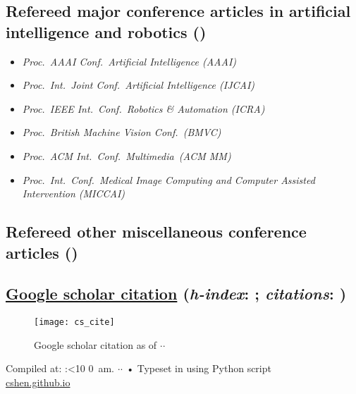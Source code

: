 \documentclass[9pt, a4paper]{article}
\newif\iftimePM
\def\now{\number\timehh:\ifnum\timemm<10 0\fi\number\timemm
         \iftimePM {$\,$pm.}  \else {$\,$am.}  \fi}
\edef\today{\number\day$\cdot$\number\month$\cdot$\number\year}
\begin{document}
\subsection*{Refereed major conference articles in artificial intelligence and robotics (\unskip)
}
{
\begin{itemize}
  \itemsep -.12cm
\footnotesize
\item \emph{  Proc.\ AAAI Conf.\ Artificial Intelligence (AAAI)}
\item \emph{  Proc.\ Int.\ Joint Conf.\ Artificial Intelligence (IJCAI)}
\item \emph{  Proc.\ IEEE Int.\ Conf.\  Robotics \&  Automation (ICRA)}
\item \emph{  Proc.\ British Machine Vision Conf.\ (BMVC)}
\item \emph{  Proc.\ ACM Int.\  Conf.\  Multimedia\ (ACM MM)}
\item \emph{  Proc.\ Int.\ Conf.\ Medical Image Computing and Computer Assisted Intervention (MICCAI)}

\end{itemize}
}




\noindent






\vspace{-0.15cm}
\subsection*{Refereed other miscellaneous  conference articles (\unskip)}
\noindent









\subsection*{\href{https://scholar.google.com/citations?hl=en&user=Ljk2BvIAAAAJ&view_op=list_works}{Google scholar citation} ({\it h-index}:  \unskip; {\it citations}: \unskip) }

\begin{figure}[h!]
\centering
\texttt{[image: cs\_cite]}
\caption{Google scholar citation as of \today}
\label{fig:google_scholar}
\end{figure}








\vfill{}
\begin{center}
{\scriptsize    Compiled at: \now \today\- •\- Typeset in {
\XeLaTeX{}
using Python script
}\\
\href{https://cshen.github.io}{cshen.github.io}
}
\end{center}
\end{document}
